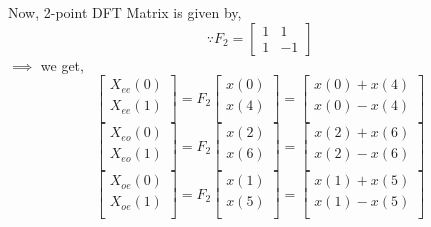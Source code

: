 \documentclass{beamer}
\begin{document}
\begin{frame}
Now, 2-point DFT Matrix is given by, 
\begin{equation}
\because
F_{2} =
\begin{bmatrix}
1 & 1 \\
1&-1
\end{bmatrix}
\end{equation}
$\implies$ we get,
\begin{equation}
\begin{bmatrix}
X_{ee}(0) \\ 
X_{ee}(1)\\ 
\end{bmatrix}
= F_{2}
\begin{bmatrix}
x(0) \\ 
x(4) \\ 
\end{bmatrix}
=
\begin{bmatrix}
x(0)+x(4) \\ 
x(0)-x(4) \\ 
\end{bmatrix}
\end{equation}
\begin{equation}
\begin{bmatrix}
X_{eo}(0) \\ 
X_{eo}(1)\\ 
\end{bmatrix}
= F_{2}
\begin{bmatrix}
x(2) \\ 
x(6) \\ 
\end{bmatrix}
=
\begin{bmatrix}
x(2)+x(6) \\ 
x(2)-x(6) \\ 
\end{bmatrix}
\end{equation}
\begin{equation}
\begin{bmatrix}
X_{oe}(0) \\ 
X_{oe}(1)\\ 
\end{bmatrix}
= F_{2}
\begin{bmatrix}
x(1) \\ 
x(5) \\ 
\end{bmatrix}
=
\begin{bmatrix}
x(1)+x(5) \\ 
x(1)-x(5) \\ 
\end{bmatrix}

\end{equation}
\end{frame}
\end{document}
